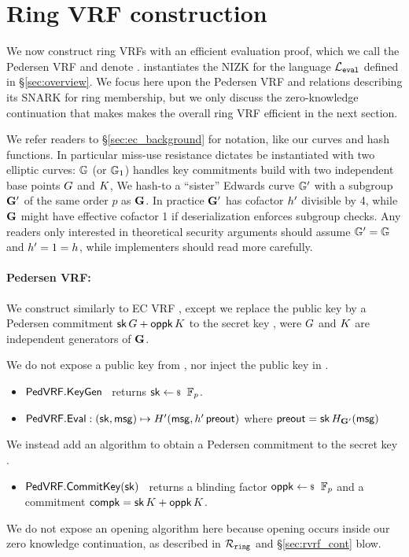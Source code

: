 \section{Ring VRF construction}%
\label{sec:pederson_vrf}

We now construct ring VRFs with an efficient evaluation proof, which
we call the Pedersen VRF and denote \PedVRF.
\PedVRF instantiates the NIZK for the language $\mathcal{L}_{\mathtt{eval}}$ defined in \S\ref{sec:overview}.
We focus here upon the Pedersen VRF and relations describing its SNARK
for ring membership, but we only discuss the zero-knowledge continuation
that makes makes the overall ring VRF efficient in the next section.

We refer readers to \S\ref{sec:ec_background} for notation,
 like our curves and hash functions.
In particular miss-use resistance dictates \PedVRF be instantiated with
two elliptic curves: ${\mathbb{G}}$ (or ${\mathbb{G}}_1$) handles key commitments
 build with two independent base points $G$ and $K$,
We hash-to a ``sister'' Edwards curve ${\mathbb{G}'}$ with a subgroup ${\mathbf{G}'}$
 of the same order $p$ as ${\mathbf{G}}$.
In practice ${\mathbf{G}'}$ has cofactor ${h'}$ divisible by 4, while
 ${\mathbf{G}}$ might have effective cofactor 1 if deserialization enforces subgroup checks.
Any readers only interested in theoretical security arguments
should assume ${\mathbb{G}'} = {\mathbb{G}}$ and ${h'} = 1 = h$,
 while implementers should read more carefully.

\paragraph{Pedersen VRF:} 
We construct \PedVRF similarly to EC VRF
 \cite{nsec5,VXEd25519,draft-irtf-cfrg-vrf-10},
except we replace the public key by a Pedersen commitment
 $\mathsf{sk} \, G + \mathsf{oppk} \, K$ to the secret key \sk,
 were $G$ and $K$ are independent generators of ${\mathbf{G}}$.

We do not expose a public key from \KeyGen, nor inject the public key in \Eval.
\begin{itemize}
    \item ${\mathsf{PedVRF}}.{\mathsf{KeyGen}}$ \, returns $\sk \leftsample \F_p$. %
    \item ${\mathsf{PedVRF}}.{\mathsf{Eval}} : (\mathsf{sk},\mathsf{msg}) \mapsto H'(\mathsf{msg}, {h'}\,{\mathsf{preout}})$ where ${\mathsf{preout}} = \mathsf{sk} \, H_{{\mathbf{G}'}}(\mathsf{msg})$
\end{itemize}
\noindent We instead add an algorithm to obtain a Pedersen commitment to the secret key \sk.
\begin{itemize}
    \item ${\mathsf{PedVRF}}.{\mathsf{CommitKey}}(\mathsf{sk})$ \,
    returns a blinding factor $\openpk \leftsample \F_p$
    and a commitment $\mathsf{compk} = \mathsf{sk} \, K + \mathsf{oppk} \, K$.
\end{itemize}
We do not expose an opening algorithm here because opening occurs inside
our zero knowledge continuation,
 as described in $\mathcal{R}_{\mathtt{ring}}$ and \S\ref{sec:rvrf_cont} blow.

